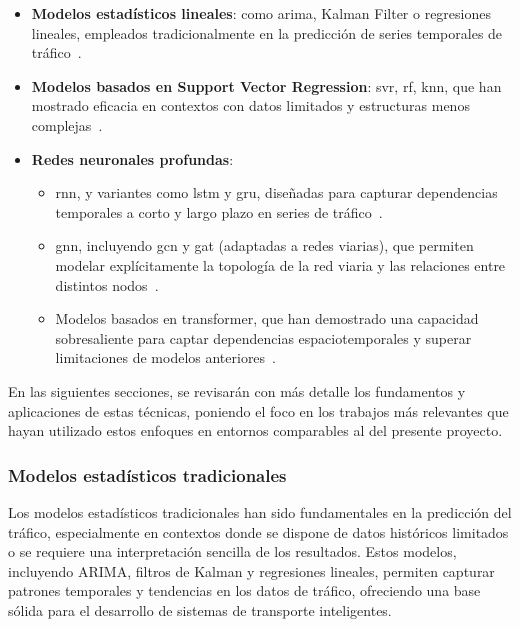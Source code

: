 \begin{itemize}
	\item \textbf{Modelos estadísticos lineales}: como \acrlong{arima}, Kalman Filter o regresiones lineales, empleados tradicionalmente en la predicción de series temporales de tráfico \cite{forecastSarima, forecastArimaLtsm, forecastKalman, liu2020congestion}.
	\item \textbf{Modelos basados en Support Vector Regression}: \acrlong{svr}, \acrlong{rf}, \acrlong{knn}, que han mostrado eficacia en contextos con datos limitados y estructuras menos complejas \cite{omar2024, forecastRf, forecastKnn}.
	\item \textbf{Redes neuronales profundas}:
	\begin{itemize}
		\item \acrlong{rnn}, y variantes como \acrlong{lstm} y \acrlong{gru}, diseñadas para capturar dependencias temporales a corto y largo plazo en series de tráfico \cite{hochreiter1997long, cho2014gru, zhao2017lstm, ma2022cnn_gru}.
		\item \acrlong{gnn}, incluyendo \acrlong{gcn} y \acrlong{gat} (adaptadas a redes viarias), que permiten modelar explícitamente la topología de la red viaria y las relaciones entre distintos nodos \cite{forecastGgnn, forecastGnn}.
		\item Modelos basados en transformer, que han demostrado una capacidad sobresaliente para captar dependencias espaciotemporales y superar limitaciones de modelos anteriores \cite{trafficformer}.
	\end{itemize}
\end{itemize}

En las siguientes secciones, se revisarán con más detalle los fundamentos y aplicaciones de estas técnicas, poniendo el foco en los trabajos más relevantes que hayan utilizado estos enfoques en entornos comparables al del presente proyecto.

\subsubsection*{Modelos estadísticos tradicionales}

Los modelos estadísticos tradicionales han sido fundamentales en la predicción del tráfico, especialmente en contextos donde se dispone de datos históricos limitados o se requiere una interpretación sencilla de los resultados. Estos modelos, incluyendo ARIMA, filtros de Kalman y regresiones lineales, permiten capturar patrones temporales y tendencias en los datos de tráfico, ofreciendo una base sólida para el desarrollo de sistemas de transporte inteligentes.

